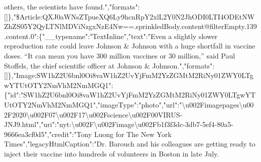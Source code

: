 others, the scientists have
found.","formats":{[}{]}\},"\$Article:QXJ0aWNsZTpueXQ6Ly9hcnRpY2xlL2Y0N2JhODI0LTI4ODEtNWZhZS05Y2QyLTNlMDViNzgxNzE4Nw==.sprinkledBody.content@filterEmpty.139.content.0":\{"\_\_typename":"TextInline","text":"Even
a slightly slower reproduction rate could leave Johnson \& Johnson with
a huge shortfall in vaccine doses. ``It can mean you have 300 million
vaccines or 30 million,'' said Paul Stoffels, the chief scientific
officer at Johnson \&
Johnson.","formats":{[}{]}\},"Image:SW1hZ2U6bnl0Oi8vaW1hZ2UvYjFmM2YzZGMtM2RiNy01ZWY0LTgwYTUtOTY2NmVhM2NmMGQ1":\{"id":"SW1hZ2U6bnl0Oi8vaW1hZ2UvYjFmM2YzZGMtM2RiNy01ZWY0LTgwYTUtOTY2NmVhM2NmMGQ1","imageType":"photo","url":"\textbackslash{}u002Fimagepages\textbackslash{}u002F2020\textbackslash{}u002F07\textbackslash{}u002F17\textbackslash{}u002Fscience\textbackslash{}u002F00VIRUS-JNJ9.html","uri":"nyt:\textbackslash{}u002F\textbackslash{}u002Fimage\textbackslash{}u002Fb1f3f3dc-3db7-5ef4-80a5-9666ea3cf0d5","credit":"Tony
Luong for The New York Times","legacyHtmlCaption":"Dr. Barouch and his
colleagues are getting ready to inject their vaccine into hundreds of
volunteers in Boston in late July.
